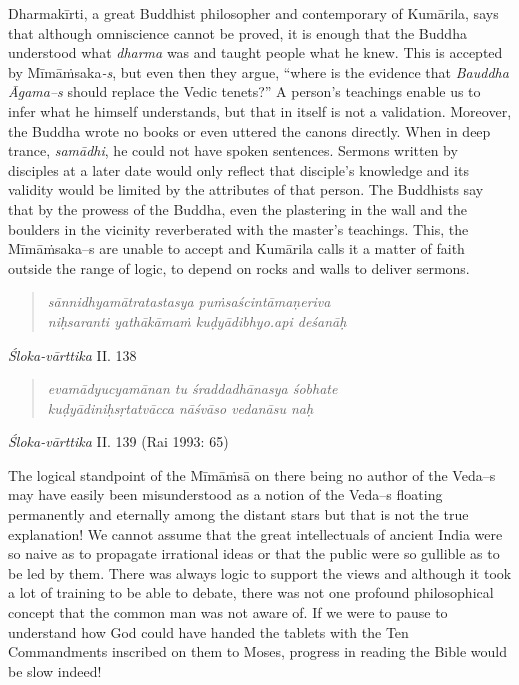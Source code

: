 Dharmakīrti, a great Buddhist philosopher and contemporary of Kumārila, says that although omniscience cannot be proved, it is enough that the Buddha understood what \textit{dharma} was and taught people what he knew. This is accepted by Mīmāṁsaka\textit{-s}, but even then they argue, “where is the evidence that \textit{Bauddha Āgama--s} should replace the Vedic tenets?” A person’s teachings enable us to infer what he himself understands, but that in itself is not a validation. Moreover, the Buddha wrote no books or even uttered the canons directly. When in deep trance, \textit{samādhi}, he could not have spoken sentences. Sermons written by disciples at a later date would only reflect that disciple’s knowledge and its validity would be limited by the attributes of that person. The Buddhists say that by the prowess of the Buddha, even the plastering in the wall and the boulders in the vicinity reverberated with the master’s teachings. This, the Mīmāṁsaka--s are unable to accept and Kumārila calls it a matter of faith outside the range of logic, to depend on rocks and walls to deliver sermons.

\begin{verse}
\textit{sānnidhyamātratastasya puṁsaścintāmaṇeriva }\\
\textit{niḥsaranti yathākāmaṁ kuḍyādibhyo.api deśanāḥ }
\end{verse}

\vspace{-0.5cm} 
\begin{flushright}
 \textit{Śloka-vārttika} II. 138
 \end{flushright}
 
  \begin{verse}
 \textit{evamādyucyamānan tu śraddadhānasya śobhate }\\
 \textit{kuḍyādiniḥsṛtatvācca nāśvāso vedanāsu naḥ }
 \end{verse}
 
 \vspace{-0.5cm} 
 \begin{flushright}
  \textit{Śloka-vārttika} II. 139 (Rai 1993: 65)
  \end{flushright}


The logical standpoint of the Mīmāṁsā on there being no author of the Veda--s may have easily been misunderstood as a notion of the Veda--s floating permanently and eternally among the distant stars but that is not the true explanation! We cannot assume that the great intellectuals of ancient India were so naive as to propagate irrational ideas or that the public were so gullible as to be led by them. There was always logic to support the views and although it took a lot of training to be able to debate, there was not one profound philosophical concept that the common man was not aware of. If we were to pause to understand how God could have handed the tablets with the Ten Commandments inscribed on them to Moses, progress in reading the Bible would be slow indeed!


